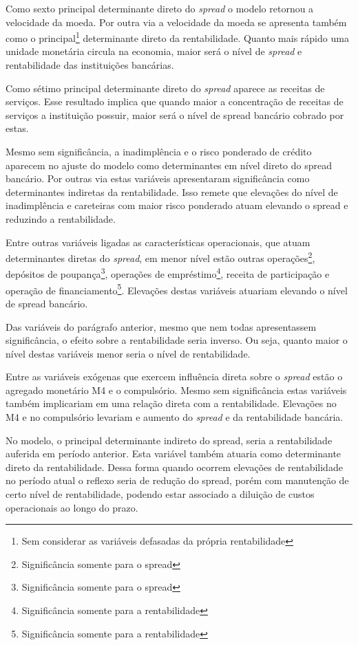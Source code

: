 \documentclass[
  12pt,
  12pt,
  openright,
  oneside,
  a4paper,
  chapter=TITLE,
  section=TITLE,
  subsection=TITLE,
  subsubsection=TITLE,
  english,
  portugues,
  sumario=tradicional]{abntex2}
\begin{document}
Como sexto principal determinante direto do \emph{spread} o modelo retornou a velocidade da moeda. Por outra via a velocidade da moeda se apresenta também como o principal\footnote{Sem considerar as variáveis defasadas da própria rentabilidade} determinante direto da rentabilidade. Quanto mais rápido uma unidade monetária circula na economia, maior será o nível de \emph{spread} e rentabilidade das instituições bancárias.

Como sétimo principal determinante direto do \emph{spread} aparece as receitas de serviços. Esse resultado implica que quando maior a concentração de receitas de serviços a instituição possuir, maior será o nível de spread bancário cobrado por estas.

Mesmo sem significância, a inadimplência e o risco ponderado de crédito aparecem no ajuste do modelo como determinantes em nível direto do spread bancário. Por outras via estas variáveis apresentaram significância como determinantes indiretas da rentabilidade. Isso remete que elevações do nível de inadimplência e careteiras com maior risco ponderado atuam elevando o spread e reduzindo a rentabilidade.

Entre outras variáveis ligadas as características operacionais, que atuam determinantes diretas do \emph{spread}, em menor nível estão outras operações\footnote{Significância somente para o spread}, depósitos de poupança\footnote{Significância somente para o spread}, operações de empréstimo\footnote{Significância somente para a rentabilidade}, receita de participação e operação de financiamento\footnote{Significância somente para a rentabilidade}. Elevações destas variáveis atuariam elevando o nível de spread bancário.

Das variáveis do parágrafo anterior, mesmo que nem todas apresentassem significância, o efeito sobre a rentabilidade seria inverso. Ou seja, quanto maior o nível destas variáveis menor seria o nível de rentabilidade.

Entre as variáveis exógenas que exercem influência direta sobre o \emph{spread} estão o agregado monetário M4 e o compulsório. Mesmo sem significância estas variáveis também implicariam em uma relação direta com a rentabilidade. Elevações no M4 e no compulsório levariam e aumento do \emph{spread} e da rentabilidade bancária.

No modelo, o principal determinante indireto do spread, seria a rentabilidade auferida em período anterior. Esta variável também atuaria como determinante direto da rentabilidade. Dessa forma quando ocorrem elevações de rentabilidade no período atual o reflexo seria de redução do spread, porém com manutenção de certo nível de rentabilidade, podendo estar associado a diluição de custos operacionais ao longo do prazo.
\end{document}
